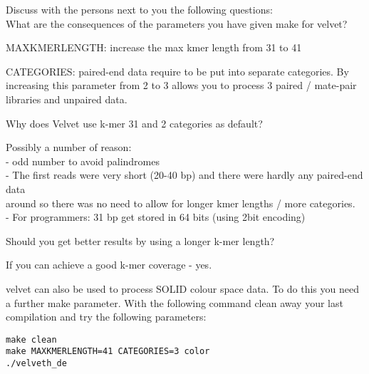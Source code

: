 \begin{questions}
Discuss with the persons next to you the following questions:\\
What are the consequences of the parameters you have given make for velvet?
\begin{answer}
MAXKMERLENGTH: increase the max kmer length from 31 to 41

CATEGORIES: paired-end data require to be put into separate categories. By
increasing this parameter from 2 to 3 allows you to process 3 paired / mate-pair
libraries and unpaired data.
\end{answer}

Why does Velvet use k-mer 31 and 2 categories as default?
\begin{answer}
Possibly a number of reason:\\
  - odd number to avoid palindromes\\
  - The first reads were very short (20-40 bp) and there were hardly any paired-end data\\
     around so there was no need to allow for longer kmer lengths / more categories.\\
  - For programmers: 31 bp get stored in 64 bits (using 2bit encoding)
\end{answer}

Should you get better results by using a longer k-mer length?
\begin{answer}
If you can achieve a good k-mer coverage - yes.
\end{answer}
\end{questions}

\begin{bonus}
velvet can also be used to process SOLID colour space data. To do this you need
a further make parameter. With the following command clean away your last
compilation and try the following parameters:
\begin{lstlisting}
make clean
make MAXKMERLENGTH=41 CATEGORIES=3 color
./velveth_de
\end{lstlisting}
\end{bonus}

